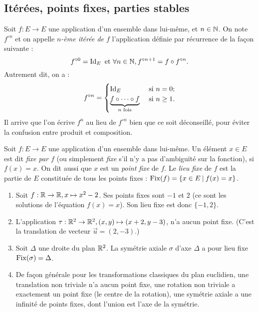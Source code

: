 \subsection{Itérées, points fixes, parties stables}

\begin{definition}
Soit $f : E\to E$ une application d'un ensemble dans lui-même, et $n\in \mathbb{N}$. On  note $f^{\circ n}$ et on appelle \emph{$n$-ème itérée de $f$}  l'application définie par récurrence de la façon suivante :
\[ f^{\circ 0} = \operatorname{Id}_E \text{ et } \forall n\in \mathbb{N}, f^{\circ n+1} = f\circ f^{\circ n}.\]
Autrement dit, on a :
\[ 
f^{\circ n} = \begin{cases}
\operatorname{Id}_E & \text{ si } n=0;\\
\underbrace{f\circ \dots \circ f}_{n \text{ fois}} & \text{ si } n\geq 1.
\end{cases}
\]
Il arrive que l'on écrive $f^n$ au lieu de $f^{\circ n}$ bien que ce soit déconseillé, pour éviter la confusion entre produit et composition.
\end{definition}

\begin{definition}
Soit $f : E\to E$ une application d'un ensemble dans lui-même. Un élément $x\in E$ est dit \emph{fixe par $f$} (ou simplement \emph{fixe} s'il n'y a pas d'ambiguïté sur la fonction), si $f(x)=x$. On dit aussi que $x$ est un \emph{point fixe} de $f$. Le \emph{lieu fixe} de $f$ est la partie de $E$ constituée de tous les points fixes : $\operatorname{Fix}(f) = \{x\in E\:|\: f(x)=x \}$.
\end{definition}

\begin{exemple}
\begin{enumerate}
\item Soit $f : \mathbb{R}\to \mathbb{R}, x\mapsto x^2-2$. Ses points fixes sont $-1$ et $2$ (ce sont les solutions de l'équation $f(x)=x$). Son lieu fixe est donc $\{-1,2\}$.
\item L'application $\tau : \mathbb{R}^2\to \mathbb{R}^2, (x,y) \mapsto (x+2,y-3)$, n'a aucun point fixe. (C'est la translation de vecteur $\vec u = (2,-3)$.)
\item Soit $\Delta$ une droite du plan $\mathbb{R}^2$. La symétrie axiale $\sigma$ d'axe $\Delta$ a pour lieu fixe $\operatorname{Fix}(\sigma)=\Delta$.
\item De façon générale pour les transformations classiques du plan euclidien, une translation non triviale n'a aucun point fixe, une rotation non triviale a exactement un point fixe (le centre de la rotation), une symétrie axiale a une infinité de points fixes, dont l'union est l'axe de la symétrie.
\end{enumerate}
\end{exemple}

